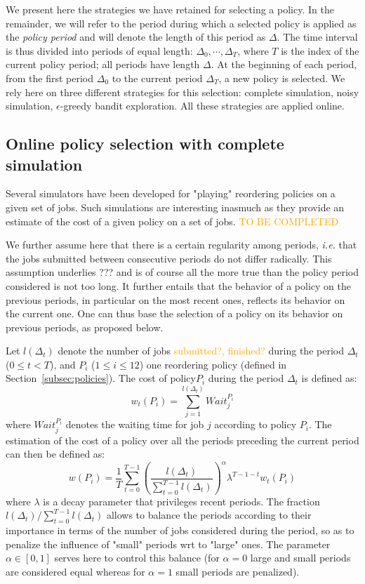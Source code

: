 \documentclass[sigconf]{acmart}
\begin{document}
We present here the strategies we have retained for selecting a policy. In the remainder, we will refer to the period during which a selected policy is applied as the \textit{policy period} and will denote the length of this period as $\Delta$. The time interval is thus divided into periods of equal length: $\Delta_0, \cdots, \Delta_T$, where $T$ is the index of the current policy period; all periods have length $\Delta$. At the beginning of each period, from the first period $\Delta_0$ to the current period $\Delta_T$, a new policy is selected. We rely here on three different strategies for this selection: complete simulation, noisy simulation, $\epsilon$-greedy bandit exploration. All these strategies are applied online.

\subsection{Online policy selection with complete simulation}
\label{sub:feedback}

Several simulators have been developed for "playing" reordering policies on a given set of jobs. Such simulations are interesting inasmuch as they provide an estimate of the cost of a given policy on a set of jobs. \textcolor{orange}{TO BE COMPLETED}

We further assume here that there is a certain regularity among periods, \textit{i.e.} that the jobs submitted between consecutive periods do not differ radically. This assumption underlies ??? and is of course all the more true than the policy period considered is not too long. It further entails that the behavior of a policy on the previous periods, in particular on the most recent ones, reflects its behavior on the current one. One can thus base the selection of a policy on its behavior on previous periods, as proposed below.

Let $l(\Delta_t)$ denote the number of jobs \textcolor{orange}{submitted?, finished?} during the period $\Delta_t$ ($0 \le t < T$), and $P_i$ ($1 \le i \le 12$) one reordering policy (defined in Section~\ref{subsec:policies}). The cost of policy$P_i$ during the period $\Delta_t$ is defined as:
%
\[
w_t(P_i) = \sum_{j=1}^{l(\Delta_t)} Wait_j^{P_i}
\]
%
where $Wait_j^{P_i}$ denotes the waiting time for job $j$ according to policy $P_i$. The estimation of the cost of a policy over all the periods preceding the current period can then be defined as:
%
\begin{equation}
w(P_i) = \frac{1}{T} \sum_{t=0}^{T-1} (\frac{l(\Delta_t)}{\sum_{t=0}^{T-1}l(\Delta_t)})^{\alpha}  \lambda^{T-1-t} w_t(P_i)
\end{equation}
%
where $\lambda$ is a decay parameter that privileges recent periods. The fraction $l(\Delta_t)/\sum_{t=0}^{T-1}l(\Delta_t)$ allows to balance the periods according to their importance in terms of the number of jobs considered during the period, so as to penalize the influence of "small" periods wrt to "large" ones. The parameter $\alpha \in [0,1]$ serves here to control this balance (for $\alpha=0$ large and small periods are considered equal whereas for $\alpha=1$ small periods are penalized).
\end{document}
